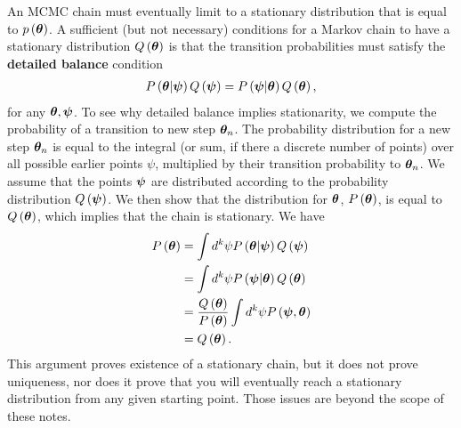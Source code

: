 An MCMC chain must eventually limit to a stationary distribution that is
equal to $p\left({\bm \theta}\right)$.
A sufficient (but not necessary) conditions for a Markov chain to have a 
stationary distribution $Q\left({\bm \theta}\right)$ is that the
transition probabilities must satisfy the \textbf{detailed balance} condition 
\begin{align}
    P\left({\bm \theta}|{\bm \psi}\right)Q\left({\bm \psi}\right)
    =
    P\left({\bm \psi}|{\bm \theta}\right)Q\left({\bm \theta}\right)
    ,
\end{align}
for any ${\bm \theta},{\bm \psi}$. 
To see why detailed balance implies stationarity, we compute the probability
of a transition to new step ${\bm \theta}_n$. 
The probability distribution for a new step ${\bm \theta}_n$ is equal to the integral (or sum, if there a discrete number of points) over all possible earlier points $\psi$, multiplied by their transition probability to ${\bm \theta}_n$.
We assume that the points ${\bm \psi}$ are distributed according to the probability distribution $Q\left({\bm \psi}\right)$. 
We then show that the distribution for ${\bm \theta}$, $P\left({\bm \theta}\right)$, is equal to $Q\left({\bm \theta}\right)$, which implies that the chain is stationary.
We have
\begin{align}
    P\left({\bm \theta}\right)
    &=
    \int d^k\psi P\left({\bm \theta}|{\bm \psi}\right) Q\left({\bm \psi}\right)
    \nonumber\\
    &=
    \int d^k\psi P\left({\bm \psi}|{\bm \theta}\right) Q\left({\bm \theta}\right)
    \nonumber\\
    &=
    \frac{Q\left({\bm \theta}\right)}{P\left({\bm \theta}\right)}
    \int d^k\psi P\left({\bm \psi},{\bm \theta}\right)
    \nonumber\\
    &=
    Q\left({\bm \theta}\right)
    .
\end{align}
This argument proves existence of a stationary chain, but it does not prove uniqueness, nor does it prove that you will eventually reach a stationary distribution from any given starting point.
Those issues are beyond the scope of these notes.

